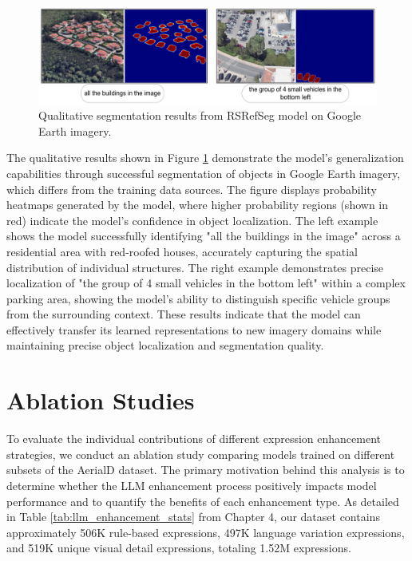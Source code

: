 \begin{figure}[H]
\centering
\includegraphics[width=\textwidth]{./Images/qualitative.png}
\caption{Qualitative segmentation results from RSRefSeg model on Google Earth imagery.}
\label{fig:qualitative_examples}
\end{figure}

The qualitative results shown in Figure \ref{fig:qualitative_examples} demonstrate the model's generalization capabilities through successful segmentation of objects in Google Earth imagery, which differs from the training data sources. The figure displays probability heatmaps generated by the model, where higher probability regions (shown in red) indicate the model's confidence in object localization. The left example shows the model successfully identifying "all the buildings in the image" across a residential area with red-roofed houses, accurately capturing the spatial distribution of individual structures. The right example demonstrates precise localization of "the group of 4 small vehicles in the bottom left" within a complex parking area, showing the model's ability to distinguish specific vehicle groups from the surrounding context. These results indicate that the model can effectively transfer its learned representations to new imagery domains while maintaining precise object localization and segmentation quality.

\section{Ablation Studies}

To evaluate the individual contributions of different expression enhancement strategies, we conduct an ablation study comparing models trained on different subsets of the AerialD dataset. The primary motivation behind this analysis is to determine whether the LLM enhancement process positively impacts model performance and to quantify the benefits of each enhancement type. As detailed in Table \ref{tab:llm_enhancement_stats} from Chapter 4, our dataset contains approximately 506K rule-based expressions, 497K language variation expressions, and 519K unique visual detail expressions, totaling 1.52M expressions.

